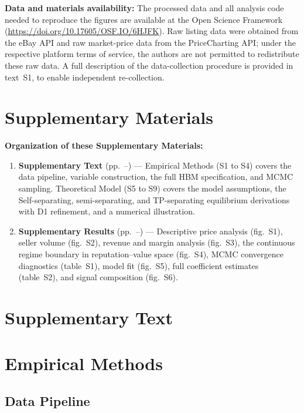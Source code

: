 \documentclass[11pt,letterpaper]{article}
\theoremstyle{definition}
\newcommand{\SItext}{%
  \section*{Supplementary Text}\label{sec:si-methods}%
}
\begin{document}
\noindent\textbf{Data and materials availability:} The processed data and all analysis code needed to reproduce the figures are available at the Open Science Framework (\url{https://doi.org/10.17605/OSF.IO/6HJFK}). Raw listing data were obtained from the eBay API and raw market-price data from the PriceCharting API; under the respective platform terms of service, the authors are not permitted to redistribute these raw data. A full description of the data-collection procedure is provided in text~S1, to enable independent re-collection.

\clearpage
\appendix
\setcounter{figure}{0}
\setcounter{table}{0}
\setcounter{equation}{0}
\setcounter{section}{0}
\section*{Supplementary Materials}
\bigskip
\noindent\textbf{Organization of these Supplementary Materials:}
\begin{enumerate}[nosep,leftmargin=2em]
\item \textbf{Supplementary Text} (pp.~\pageref{sec:si-methods}--\pageref{sec:si-methods-end}) --- Empirical Methods (S1 to S4) covers the data pipeline, variable construction, the full HBM specification, and MCMC sampling. Theoretical Model (S5 to S9) covers the model assumptions, the Self-separating, semi-separating, and TP-separating equilibrium derivations with D1 refinement, and a numerical illustration.
\item \textbf{Supplementary Results} (pp.~\pageref{sec:si-results-top}--\pageref{sec:si-results-end}) --- Descriptive price analysis (fig.~S1), seller volume (fig.~S2), revenue and margin analysis (fig.~S3), the continuous regime boundary in reputation--value space (fig.~S4), MCMC convergence diagnostics (table~S1), model fit (fig.~S5), full coefficient estimates (table~S2), and signal composition (fig.~S6).
\end{enumerate}

\clearpage

\SItext

\section{Empirical Methods}\label{sec:si-empirical}

\subsection{Data Pipeline}\label{subsec:emp-A}
\end{document}
